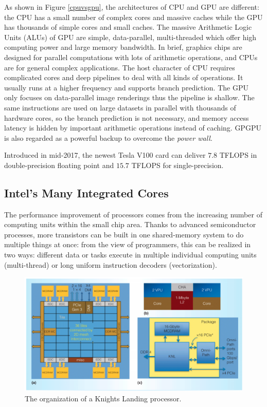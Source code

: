 As shown in Figure \ref{cpuvsgpu}, the architectures of CPU and GPU are different: the CPU has a small number of complex cores and massive caches while the GPU has thousands of simple cores and small caches. The massive Arithmetic Logic Units (ALUs) of GPU are simple, data-parallel, multi-threaded which offer high computing power and large memory bandwidth. In brief, graphics chips are designed for parallel computations with lots of arithmetic operations, and CPUs are for general complex applications. The host character of CPU requires complicated cores and deep pipelines to deal with all kinds of operations. It usually runs at a higher frequency and supports branch prediction. The GPU only focuses on data-parallel image renderings thus the pipeline is shallow. The same instructions are used on large datasets in parallel with thousands of hardware cores, so the branch prediction is not necessary, and memory access latency is hidden by important arithmetic operations instead of caching. GPGPU is also regarded as a powerful backup to overcome the \textit{power wall}.

Introduced in mid-2017, the newest Tesla V100 card can deliver $7.8$ TFLOPS in double-precision floating point and $15.7$ TFLOPS for single-precision.

\subsection{Intel's Many Integrated Cores}

The performance improvement of processors comes from the increasing number of computing units within the small chip area. Thanks to advanced semiconductor processes, more transistors can be built in one shared-memory system to do multiple things at once: from the view of programmers, this can be realized in two ways: different data or tasks execute in multiple individual computing units (multi-thread) or long uniform instruction decoders (vectorization).

\begin{figure}[htbp]
	\centering
	\includegraphics[width=6.3in]{fig/KNL1.png}
	\caption{The organization of a Knights Landing processor.}
	\label{knl1}
\end{figure}


